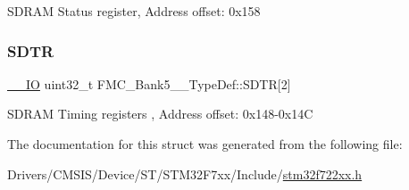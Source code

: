 S\+D\+R\+AM Status register, Address offset\+: 0x158 \mbox{\label{struct_f_m_c___bank5__6___type_def_a8438638391415aaa0dc96714f28915ae}} 
\subsubsection{\texorpdfstring{SDTR}{SDTR}}
{\footnotesize\ttfamily \mbox{\hyperlink{core__sc300_8h_aec43007d9998a0a0e01faede4133d6be}{\+\_\+\+\_\+\+IO}} uint32\+\_\+t F\+M\+C\+\_\+\+Bank5\+\_\+\_\+\+Type\+Def\+::\+S\+D\+TR\mbox{[}2\mbox{]}}

S\+D\+R\+AM Timing registers , Address offset\+: 0x148-\/0x14C 

The documentation for this struct was generated from the following file\+:\begin{DoxyCompactItemize}
\item 
Drivers/\+C\+M\+S\+I\+S/\+Device/\+S\+T/\+S\+T\+M32\+F7xx/\+Include/\mbox{\hyperlink{stm32f722xx_8h}{stm32f722xx.\+h}}\end{DoxyCompactItemize}
